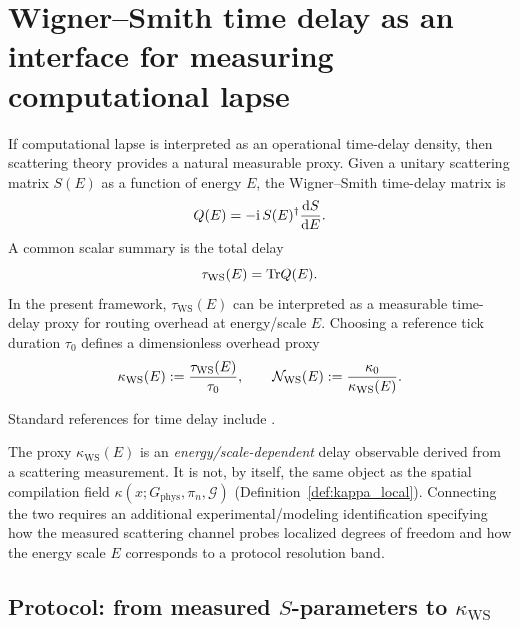 
\section{Wigner--Smith time delay as an interface for measuring computational lapse}
\label{app:wigner_smith}

If computational lapse is interpreted as an operational time-delay density, then scattering theory provides a natural measurable proxy.
Given a unitary scattering matrix $S(E)$ as a function of energy $E$, the Wigner--Smith time-delay matrix is
\begin{equation}
\label{eq:wigner_smith}
Q(E)=-\mathrm{i}\,S(E)^\dagger\frac{\mathrm{d} S}{\mathrm{d} E}.
\end{equation}
A common scalar summary is the total delay
\begin{equation}
\label{eq:tau_ws_trace}
\tau_{\mathrm{WS}}(E)=\mathrm{Tr} Q(E).
\end{equation}
In the present framework, $\tau_{\mathrm{WS}}(E)$ can be interpreted as a measurable time-delay proxy for routing overhead at energy/scale $E$.
Choosing a reference tick duration $\tau_0$ defines a dimensionless overhead proxy
\[
\kappa_{\mathrm{WS}}(E):=\frac{\tau_{\mathrm{WS}}(E)}{\tau_0},
\qquad
\mathcal{N}_{\mathrm{WS}}(E):=\frac{\kappa_0}{\kappa_{\mathrm{WS}}(E)}.
\]

Standard references for time delay include \cite{Wigner1955,Smith1960}.

\begin{remark}
\label{rem:kappa_ws_scope}
The proxy $\kappa_{\mathrm{WS}}(E)$ is an \emph{energy/scale-dependent} delay observable derived from a scattering measurement.
It is not, by itself, the same object as the spatial compilation field $\kappa(x;G_{\mathrm{phys}},\pi_n,\mathcal{G})$ (Definition~\ref{def:kappa_local}).
Connecting the two requires an additional experimental/modeling identification specifying how the measured scattering channel probes localized degrees of freedom and how the energy scale $E$ corresponds to a protocol resolution band.
\end{remark}

\subsection{Protocol: from measured \texorpdfstring{$S$}{S}-parameters to \texorpdfstring{$\kappa_{\mathrm{WS}}$}{kappaWS}}
\label{app:wigner_smith_protocol}

